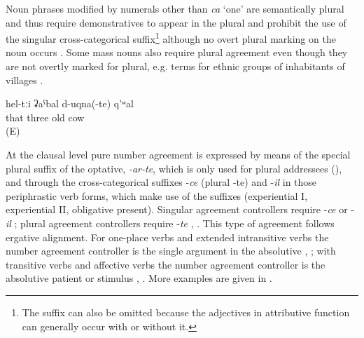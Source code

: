 Noun phrases modified by numerals other than \textit{ca} `one' are semantically plural and thus require demonstratives to appear in the plural and prohibit the use of the singular cross-categorical suffix\footnote{The suffix can also be omitted because the adjectives in attributive function can generally occur with or without it.} although no overt plural marking on the noun occurs . Some mass nouns also require plural agreement even though they are not overtly marked for plural, e.g. terms for ethnic groups of inhabitants of villages .

\begin{exe}
	\ex	\label{ex:‎‎‎three old cowsAGREE}
	\gll	hel-tːi ʡaˁbal	d-uqna(-te)	q'ʷal\\
		that three old 	cow\\
	\glt	{} (E)
\end{exe}

At the clausal level pure number agreement is expressed by means of the special plural suffix of the optative, \textit{-ar-te}, which is only used for plural addressees  (), and through the cross-categorical suffixes -\textit{ce} (plural -te) and -\textit{il} in those periphrastic verb forms, which make use of the suffixes (experiential I, experiential II, obligative present). Singular agreement controllers require -\textit{ce}  or -\textit{il} ; plural agreement controllers require -\textit{te} , . This type of agreement follows ergative alignment. For one-place verbs and extended intransitive verbs the number agreement controller is the single argument in the absolutive , ; with transitive verbs and affective verbs the number agreement controller is the absolutive patient or stimulus , . More examples are given in .

